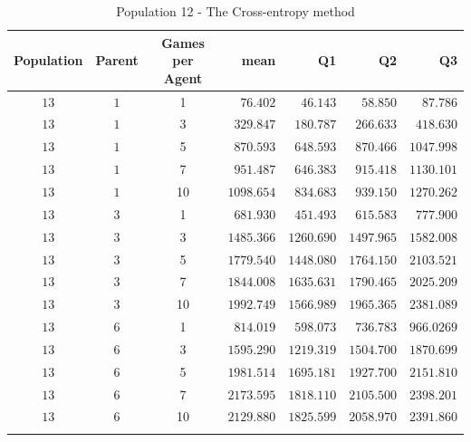 \begin{table}[H]
\centering
\small
\begin{tabular}{c c c r r r r}
Population & Parent & Games per Agent & mean & Q1 & Q2 & Q3\\
\hline
$13$ & $1$ & 1 & $76.402$ & $46.143$ & $58.850$ & $87.786$\\
$13$ & $1$ & 3 & $329.847$ & $180.787$ & $266.633$ & $418.630$\\
$13$ & $1$ & 5 & $870.593$ & $648.593$ & $870.466$ & $1047.998$\\
$13$ & $1$ & 7 & $951.487$ & $646.383$ & $915.418$ & $1130.101$\\
\hdashline
$13$ & $1$ & 10 & $1098.654$ & $834.683$ & $939.150$ & $1270.262$\\
\hdashline
$13$ & $3$ & 1 & $681.930$ & $451.493$ & $615.583$ & $777.900$\\
$13$ & $3$ & 3 & $1485.366$ & $1260.690$ & $1497.965$ & $1582.008$\\
$13$ & $3$ & 5 & $1779.540$ & $1448.080$ & $1764.150$ & $2103.521$\\
$13$ & $3$ & 7 & $1844.008$ & $1635.631$ & $1790.465$ & $2025.209$\\
\hdashline
$13$ & $3$ & 10 & $1992.749$ & $1566.989$ & $1965.365$ & $2381.089$\\
\hdashline
$13$ & $6$ & 1 & $814.019$ & $598.073$ & $736.783$ & $966.0269$\\
$13$ & $6$ & 3 & $1595.290$ & $1219.319$ & $1504.700$ & $1870.699$\\
$13$ & $6$ & 5 & $1981.514$ & $1695.181$ & $1927.700$ & $2151.810$\\
\hdashline
$13$ & $6$ & 7 & $2173.595$ & $1818.110$ & $2105.500$ & $2398.201$\\
\hdashline
$13$ & $6$ & 10 & $2129.880$ & $1825.599$ & $2058.970$ & $2391.860$\\
\hdashline
\end{tabular}
\caption{Population 12 - The Cross-entropy method}
\end{table}

